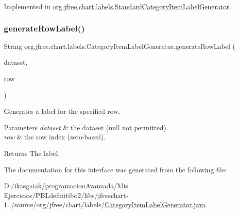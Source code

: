 Implemented in \mbox{\hyperlink{classorg_1_1jfree_1_1chart_1_1labels_1_1_standard_category_item_label_generator_a966ea4561ba36347b8af7e4f2ebe37f6}{org.\+jfree.\+chart.\+labels.\+Standard\+Category\+Item\+Label\+Generator}}.

\mbox{\label{interfaceorg_1_1jfree_1_1chart_1_1labels_1_1_category_item_label_generator_af16f2beea92dee57d6de10f2248f2235}} 
\subsubsection{\texorpdfstring{generate\+Row\+Label()}{generateRowLabel()}}
{\footnotesize\ttfamily String org.\+jfree.\+chart.\+labels.\+Category\+Item\+Label\+Generator.\+generate\+Row\+Label (\begin{DoxyParamCaption}\item[{\mbox{\hyperlink{interfaceorg_1_1jfree_1_1data_1_1category_1_1_category_dataset}{Category\+Dataset}}}]{dataset,  }\item[{int}]{row }\end{DoxyParamCaption})}

Generates a label for the specified row.


\begin{DoxyParams}{Parameters}
{\em dataset} & the dataset ({\ttfamily null} not permitted). \\
\hline
{\em row} & the row index (zero-\/based).\\
\hline
\end{DoxyParams}
\begin{DoxyReturn}{Returns}
The label. 
\end{DoxyReturn}


The documentation for this interface was generated from the following file\+:\begin{DoxyCompactItemize}
\item 
D\+:/ikasgaiak/programacion\+Avanzada/\+Mis Ejercicios/\+P\+B\+Ldefinitibo2/libs/jfreechart-\/1../source/org/jfree/chart/labels/\mbox{\hyperlink{_category_item_label_generator_8java}{Category\+Item\+Label\+Generator.\+java}}\end{DoxyCompactItemize}
